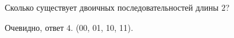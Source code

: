 \begin{task}{0}
Сколько существует двоичных последовательностей длины $2$?
\end{task}
\begin{solution}
Очевидно, ответ $4$. (00, 01, 10, 11).
\end{solution}
